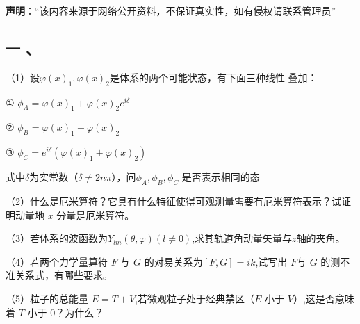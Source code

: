 
\textbf{声明}：“该内容来源于网络公开资料，不保证真实性，如有侵权请联系管理员”

\subsection{一 、}

（1）设$\varphi(x)_1, \varphi(x)_2$是体系的两个可能状态，有下面三种线性
叠加：

① $\phi_A = \varphi(x)_1 + \varphi(x)_2  e^{i\delta}$ 

② $\phi_B= \varphi(x)_1 + \varphi(x)_2 $

③ $\phi_C =e^{i\delta} (\varphi(x)_1 + \varphi(x)_2)$

式中$\delta$为实常数（$\delta \ne 2n\pi$），问$\phi_A ,\phi_B , \phi_C$ 是否表示相同的态

（2）什么是厄米算符？它具有什么特征使得可观测量需要有厄米算符表示？试证明动量地 $x$ 分量是厄米算符。

（3）若体系的波函数为$Y_{lm} (\theta, \varphi)(l\ne 0)$,求其轨道角动量矢量与$z$轴的夹角。

（4）若两个力学量算符 $F$ 与 $G$ 的对易关系为$[F,G]=ik$,试写出 $F$与 $G$ 的测不准关系式，有哪些要求。

（5）粒子的总能量 $E=T+V$,若微观粒子处于经典禁区（$E$ 小于 $V$）,这是否意味着 $T$ 小于 0？为什么？